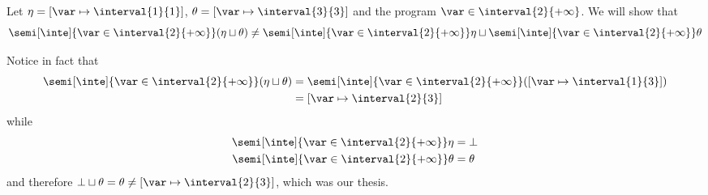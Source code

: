 \begin{example}
  Let \(\eta = [\var\mapsto\interval{1}{1}]\),
  \(\theta = [\var\mapsto\interval{3}{3}]\) and the program
  \(\var\in\interval{2}{+\infty}\). We will show that
  \begin{equation*}
    \semi[\inte]{\var\in\interval{2}{+\infty}}(\eta \sqcup \theta) \neq
    \semi[\inte]{\var\in\interval{2}{+\infty}}\eta \sqcup \semi[\inte]{\var\in\interval{2}{+\infty}}\theta
  \end{equation*}

  Notice in fact that
  \begin{align*}
    \semi[\inte]{\var\in\interval{2}{+\infty}}(\eta \sqcup \theta) & = \semi[\inte]{\var\in\interval{2}{+\infty}}([\var\mapsto\interval{1}{3}]) \\
                                                                   & = [\var\mapsto\interval{2}{3}]
  \end{align*}
  while
  \begin{align*}
    \semi[\inte]{\var\in\interval{2}{+\infty}}\eta & = \bot \\
    \semi[\inte]{\var\in\interval{2}{+\infty}}\theta & = \theta \\
  \end{align*}
  and therefore
  \(\bot \sqcup \theta = \theta \neq [\var\mapsto\interval{2}{3}]\),
  which was our thesis.
\end{example}


